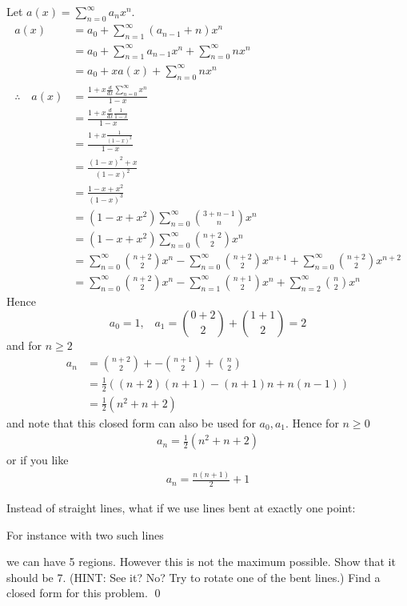 \newpage
Let $a(x) = \sum_{n=0}^\infty a_n x^n$.
\begin{align*}
a(x) 
&= a_0 + \sum_{n=1}^\infty (a_{n-1} + n) x^n \\
&= a_0 + \sum_{n=1}^\infty a_{n-1} x^n + \sum_{n=0}^\infty n x^n \\
&= a_0 + x a(x) + \sum_{n=0}^\infty n x^n \\
\therefore\,\,\,\,\,\,
a(x) 
&= 
\frac{1 + x\frac{d}{dx} \sum_{n=0}^\infty x^n}{1 - x} \\
&=\frac{1 + x\frac{d}{dx} \frac{1}{1-x} }{1 - x} \\
&=\frac{1 + x \frac{1}{(1-x)^2} }{1 - x} \\
&=\frac{(1-x)^2 + x}{(1 - x)^2} \\
&=\frac{1 - x + x^2}{(1 - x)^3} \\
&=(1 - x + x^2) \sum_{n=0}^\infty \binom{3 + n - 1}{n} x^n \\
&=(1 - x + x^2) \sum_{n=0}^\infty \binom{n + 2}{2} x^n \\
&=
\sum_{n=0}^\infty \binom{n + 2}{2} x^n
- \sum_{n=0}^\infty \binom{n + 2}{2} x^{n+1}
+ \sum_{n=0}^\infty \binom{n + 2}{2} x^{n+2} \\
&=
\sum_{n=0}^\infty \binom{n + 2}{2} x^n
- \sum_{n=1}^\infty \binom{n + 1}{2} x^{n}
+ \sum_{n=2}^\infty \binom{n}{2} x^{n}
\end{align*}
Hence
\[
a_0 = 1, \,\,\,\,\,
a_1 = \binom{0 + 2}{2} + \binom{1 + 1}{2} = 2
\]
and for $n \geq 2$
\begin{align*}
a_n 
&= 
\binom{n + 2}{2} +
- \binom{n + 1}{2}
+ \binom{n}{2} \\
&= \frac{1}{2} 
((n+2)(n+1)
- (n+1)n
+ n(n-1)) \\
&= \frac{1}{2} 
(n^2 
+ n
+ 2)
\end{align*}
and note that this closed form 
can also be used for $a_0, a_1$.
Hence for $n \geq 0$
\begin{align*}
a_n 
= \frac{1}{2}
(n^2 
+ n
+ 2)
\end{align*}
or if you like
\begin{align*}
a_n 
= \frac{n(n+1)}{2} + 1
\end{align*}


\newpage
\begin{ex}
Instead of straight lines, what if we use lines bent at exactly one
point:

For instance with two such lines

we can have 5 regions.
However this is not the maximum possible.
Show that it should be 7.
(HINT: See it? No?
Try to rotate one of the bent lines.)
Find a closed form for this problem.
\qed
\end{ex}

